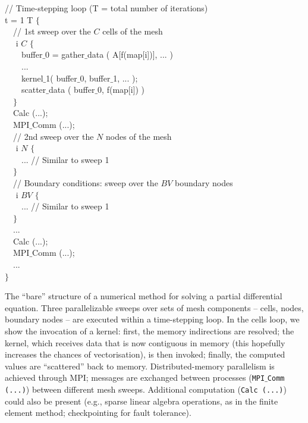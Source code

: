 \begin{algorithm}[t]
\scriptsize\ttfamily
{}

// Time-stepping loop (T = total number of iterations)\\
 t = 1  T $\lbrace$\\
~~// 1st sweep over the $C$ cells of the mesh\\
~~ i  $C$ $\lbrace$\\
~~~~buffer$\_$0 = gather$\_$data ( A[f(map[i])], ... )\\
~~~~...\\
~~~~kernel$\_$1( buffer$\_$0, buffer$\_$1, ... );\\
~~~~scatter$\_$data ( buffer$\_$0, f(map[i]) )\\
~~$\rbrace$\\
~~Calc (...);\\
~~MPI$\_$Comm (...); \\
~~// 2nd sweep over the $N$ nodes of the mesh\\
~~ i  $N$ $\lbrace$\\
~~~~... // Similar to sweep 1 \\
~~$\rbrace$\\
~~// Boundary conditions: sweep over the $BV$ boundary nodes\\
~~ i  $BV$ $\lbrace$\\
~~~~... // Similar to sweep 1 \\
~~$\rbrace$\\
~~...\\
~~Calc (...);\\
~~MPI$\_$Comm (...); \\
~~...\\
$\rbrace$
\caption{The ``bare'' structure of a numerical method for solving a partial differential equation. Three parallelizable sweeps over sets of mesh components -- cells, nodes, boundary nodes -- are executed within a time-stepping loop. In the cells loop, we show the invocation of a kernel: first, the memory indirections are resolved; the kernel, which receives data that is now contiguous in memory (this hopefully increases the chances of vectorisation),  is then invoked; finally, the computed values are ``scattered'' back to memory. Distributed-memory parallelism is achieved through MPI; messages are exchanged between processes (\texttt{MPI$\_$Comm (...)}) between different mesh sweeps. Additional computation (\texttt{Calc (...)}) could also be present (e.g., sparse linear algebra operations, as in the finite element method; checkpointing for fault tolerance).}
\label{code:tiling-struct}
\end{algorithm}

